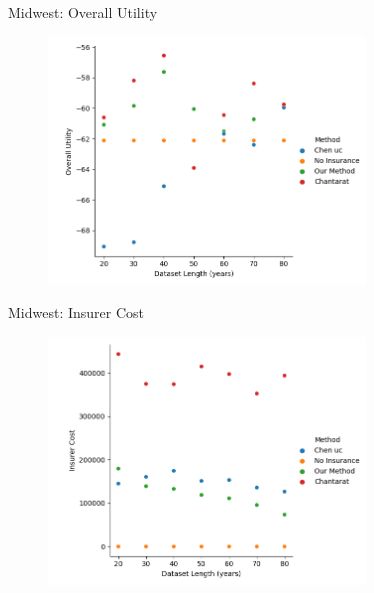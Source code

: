 \documentclass{beamer}
\begin{document}
\begin{frame}{Midwest: Overall Utility}
    \begin{figure}
        \includegraphics[width=0.75\textwidth]{../../../output/figures/Midwest Evaluation/Midwest_Overall Utility_Length.png}
    \end{figure}
\end{frame}

\begin{frame}{Midwest: Insurer Cost}
    \begin{figure}
        \includegraphics[width=0.75\textwidth]{../../../output/figures/Midwest Evaluation/Midwest_Insurer Cost_Length.png}
    \end{figure}
\end{frame}
\end{document}
